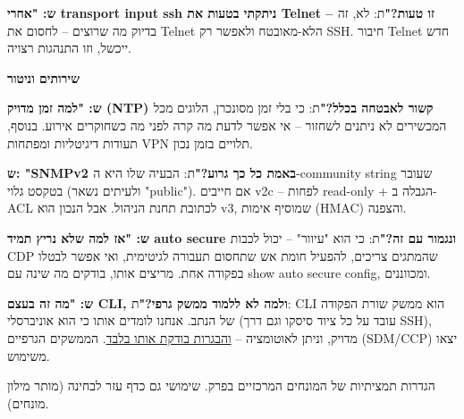 \documentclass[11pt]{article}
\newcommand{\enLR}[1]{\textenglish{#1}}
\newcommand{\code}[1]{\textenglish{\codefont #1}}
\newcommand{\sectionheading}[1]{\vskip10pt\penalty-200{\large\bfseries\color{h2}#1\par}\vskip3pt}
\newcommand{\subheading}[1]{\vskip6pt{\bfseries\color{h3}#1\par}\vskip2pt}
\begin{document}
\textbf{ש: "אחרי \code{transport input ssh} ניתקתי בטעות את \enLR{Telnet} – זו טעות?"}\newline ת: לא, זה בדיוק מה שרוצים – לחסום את \enLR{Telnet} הלא-מאובטח ולאפשר רק \enLR{SSH.} חיבור \enLR{Telnet} חדש ייכשל, וזו התנהגות רצויה.\par

\subheading{שירותים וניטור}

\textbf{ש: "למה זמן מדויק \enLR{(NTP)} קשור לאבטחה בכלל?"}\newline ת: כי בלי זמן מסונכרן, הלוגים מכל המכשירים לא ניתנים לשחזור – אי אפשר לדעת מה קרה לפני מה כשחוקרים אירוע. בנוסף, תעודות דיגיטליות ומפתחות \enLR{VPN} תלויים בזמן נכון.\par

\textbf{ש: "\enLR{SNMPv2} באמת כל כך גרוע?"}\newline ת: הבעיה שלו היא ה-\enLR{community string} שעובר בטקסט גלוי (ולעיתים נשאר "\enLR{public").} אם חייבים \enLR{v2c} – לפחות \enLR{read-only} + הגבלה ב-\enLR{ACL} לכתובת תחנת הניהול. אבל הנכון הוא \enLR{v3}, שמוסיף אימות \enLR{(HMAC)} והצפנה.\par

\textbf{ש: "אז למה שלא נריץ תמיד \code{auto secure} ונגמור עם זה?"}\newline ת: כי הוא "עיוור" – יכול לכבות \enLR{CDP} שהמתגים צריכים, להפעיל חומת אש שתחסום תעבורה לגיטימית, ואי אפשר לבטלו בפקודה אחת. מריצים אותו, בודקים מה שינה עם \code{show auto secure config}, ומכווננים.\par

\textbf{ש: "מה זה בעצם \enLR{CLI}, ולמה לא ללמוד ממשק גרפי?"}\newline ת: \enLR{CLI} הוא ממשק שורת הפקודה של הנתב. אנחנו לומדים אותו כי הוא אוניברסלי (עובד על כל ציוד סיסקו וגם דרך \enLR{SSH)}, מדויק, וניתן לאוטומציה – \underline{והבגרות בודקת אותו בלבד}. הממשקים הגרפיים \enLR{(SDM/CCP)} יצאו משימוש.\par

\sectionheading{מילון מונחים – הגדרות}

הגדרות תמציתיות של המונחים המרכזיים בפרק. שימושי גם כדף עזר לבחינה (מותר מילון מונחים).\par
\end{document}
